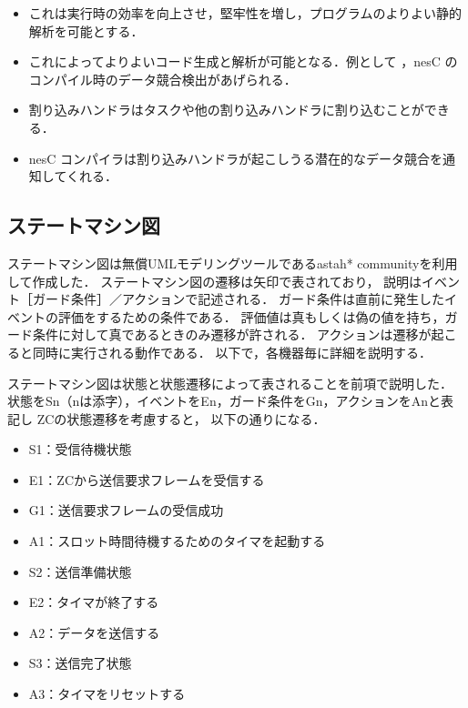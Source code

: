 \documentclass[12pt]{jreport}
\begin{document}
      \begin{itemize}
   	\item これは実行時の効率を向上させ，堅牢性を増し，プログラムのよりよい静的解析を可能とする．
       \end{itemize}
      \begin{itemize}
   	\item これによってよりよいコード生成と解析が可能となる．例として ，nesC のコンパイル時のデータ競合検出があげられる．
       \end{itemize}
      \begin{itemize}
   	\item 割り込みハンドラはタスクや他の割り込みハンドラに割り込むことができる．
	\item nesC コンパイラは割り込みハンドラが起こしうる潜在的なデータ競合を通知してくれる．
       \end{itemize}
  

\subsection{ステートマシン図}
ステートマシン図は無償UMLモデリングツールであるastah* communityを利用して作成した．
ステートマシン図の遷移は矢印で表されており，
説明はイベント［ガード条件］／アクションで記述される．
ガード条件は直前に発生したイベントの評価をするための条件である．
評価値は真もしくは偽の値を持ち，ガード条件に対して真であるときのみ遷移が許される．
アクションは遷移が起こると同時に実行される動作である．
以下で，各機器毎に詳細を説明する．

ステートマシン図は状態と状態遷移によって表されることを前項で説明した．
状態をSn（nは添字），イベントをEn，ガード条件をGn，アクションをAnと表記し
ZCの状態遷移を考慮すると，
以下の通りになる．

\begin{itemize}
 \item S1：受信待機状態
 \item E1：ZCから送信要求フレームを受信する
 \item G1：送信要求フレームの受信成功
 \item A1：スロット時間待機するためのタイマを起動する
 \item S2：送信準備状態
 \item E2：タイマが終了する
 \item A2：データを送信する
 \item S3：送信完了状態
 \item A3：タイマをリセットする
\end{itemize}
\end{document}
